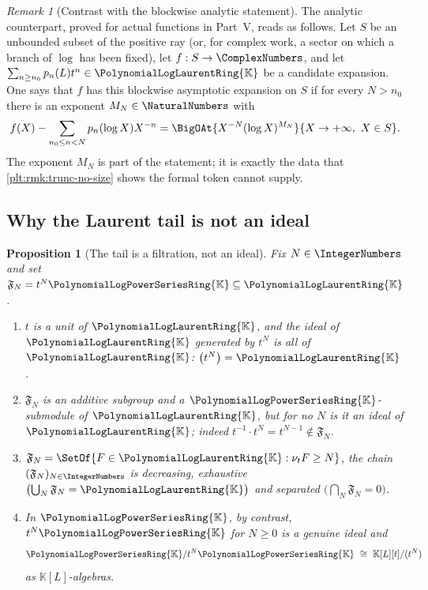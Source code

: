 \documentclass[11pt,oneside]{article}
\theoremstyle{plain}
\newtheorem{proposition}[theorem]{Proposition}
\theoremstyle{definition}
\theoremstyle{remark}
\newtheorem{remark}[theorem]{Remark}
\newcommand{\K}{\mathbb{K}}
\newcommand{\PLpow}{\PolynomialLogPowerSeriesRing{\K}}   %
\newcommand{\PLlau}{\PolynomialLogLaurentRing{\K}}       %
\newcommand{\ordt}{\nu_{t}}                              %
\begin{document}
\begin{remark}[Contrast with the blockwise analytic statement]
\label{plt:rmk:trunc-blockwise}
The analytic counterpart, proved for actual functions in Part~V, reads as
follows.  Let \(S\) be an unbounded subset of the positive ray (or, for
complex work, a sector on which a branch of \(\log\) has been fixed), let
\(f:S\to\ComplexNumbers\), and let
\(\sum_{n\ge n_0}p_n(L)t^n\in\PLlau\) be a candidate expansion.  One says that
\(f\) has this blockwise asymptotic expansion on \(S\) if for every
\(N>n_0\) there is an exponent \(M_N\in\NaturalNumbers\) with
\[
  f(X)-\sum_{n_0\le n<N}p_n(\log X)X^{-n}
  =\BigOAt{X^{-N}(\log X)^{M_N}}{X\to+\infty,\ X\in S}.
\]
The exponent \(M_N\) is part of the statement; it is exactly the data that
\cref{plt:rmk:trunc-no-size} shows the formal token cannot supply.
\end{remark}

\subsection{Why the Laurent tail is not an ideal}
\label{plt:sec:trunc-not-ideal}

\begin{proposition}[The tail is a filtration, not an ideal]
\label{plt:prop:trunc-not-ideal}
Fix \(N\in\IntegerNumbers\) and set \(\mathfrak F_N=t^N\PLpow\subseteq\PLlau\).
\begin{enumerate}[label=\textup{(\roman*)}]
\item \(t\) is a unit of \(\PLlau\), and the ideal of \(\PLlau\) generated by
  \(t^N\) is all of \(\PLlau\):
  \(\bigl(t^N\bigr)=\PLlau\).
\item \(\mathfrak F_N\) is an additive subgroup and a \(\PLpow\)-submodule of
  \(\PLlau\), but for no \(N\) is it an ideal of \(\PLlau\); indeed
  \(t^{-1}\cdot t^N=t^{N-1}\notin\mathfrak F_N\).
\item \(\mathfrak F_N=\SetOf{F\in\PLlau:\ordt F\ge N}\), the chain
  \((\mathfrak F_N)_{N\in\IntegerNumbers}\) is decreasing, exhaustive
  \(\bigl(\bigcup_N\mathfrak F_N=\PLlau\bigr)\) and separated
  \(\bigl(\bigcap_N\mathfrak F_N=0\bigr)\).
\item In \(\PLpow\), by contrast, \(t^N\PLpow\) for \(N\ge0\) is a genuine
  ideal and
  \[
    \PLpow/t^N\PLpow\ \cong\ \K[L][t]/(t^N)
  \]
  as \(\K[L]\)-algebras.
\end{enumerate}
\end{proposition}
\end{document}

